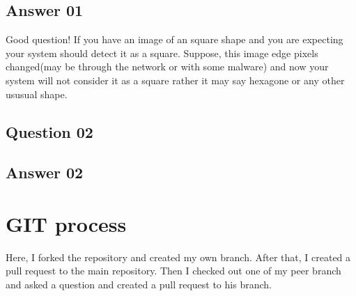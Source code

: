 \documentclass[11pt, letterpaper]{article}
\begin{document}
\subsection{Answer 01}
Good question! If you have an image of an square shape and  you are expecting your system should detect it as a square. Suppose, this image edge pixels changed(may be through the network or with some malware) and now  your system will not consider it as a square rather it may say hexagone or any other ususual shape.
\subsection{Question 02}
\subsection{Answer 02}
\section{GIT process}
Here, I forked the repository and created my own branch. After that, I created a pull request to the main repository. Then I checked out one of my peer branch and asked a question and created a pull request to his branch.
\end{document}
